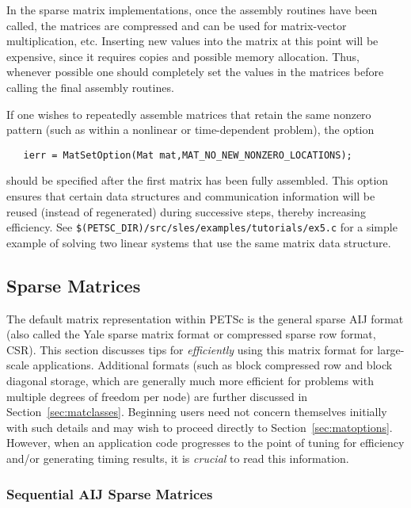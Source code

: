 In the sparse matrix implementations, once the assembly routines have been 
called, the matrices are compressed and can be used for matrix-vector
multiplication, etc.
Inserting new values into the matrix at this point will be expensive, 
since it requires copies and possible memory allocation. Thus, whenever 
possible one should completely set the values in the matrices before 
calling the final assembly routines. 

If one wishes to repeatedly assemble matrices that retain the same
nonzero pattern (such as within a nonlinear or time-dependent
problem), the option
\begin{verbatim}
   ierr = MatSetOption(Mat mat,MAT_NO_NEW_NONZERO_LOCATIONS);
\end{verbatim}
should be specified after the first matrix has been fully assembled.
This option ensures that certain data structures and communication
information will be reused (instead of regenerated) during successive
steps, thereby increasing efficiency.  
See {\tt \$(PETSC\_DIR)/src/sles/examples/tutorials/ex5.c} for a simple example of
solving two linear systems that use the same matrix data structure.

\subsection{Sparse Matrices}
\label{sec:matsparse}

The default matrix representation within PETSc is the general sparse 
AIJ format (also called the Yale sparse matrix format or compressed
sparse row format, CSR).  This section discusses tips for {\em efficiently}
using this matrix format for large-scale applications. Additional
formats (such as block compressed row and block diagonal storage,
which are generally much more efficient for problems with multiple
degrees of freedom per node) are further discussed in
Section~\ref{sec:matclasses}.  Beginning users need not concern
themselves initially with such details and may wish to proceed
directly to Section~\ref{sec:matoptions}.  However, when an
application code progresses to the point of tuning for efficiency
and/or generating timing results, it is {\em crucial} to read this
information.

\subsubsection{Sequential AIJ Sparse Matrices}

